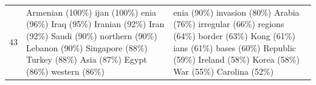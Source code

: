 \documentclass{article}
\begin{document}
\begin{table}[htbp]
\begin{tabular}{p{1.4cm} p{6cm} p{6cm}}
\midrule
43 & \colorbox{lightOlmoeLightBlue}{ Armenian} (100\%) \colorbox{lightOlmoeLightBlue}{ijan} (100\%) \colorbox{lightOlmoeLightBlue}{enia} (96\%) \colorbox{lightOlmoeLightBlue}{ Iraq} (95\%) \colorbox{lightOlmoeLightBlue}{ Iranian} (92\%) \colorbox{lightOlmoeLightBlue}{ Iran} (92\%) \colorbox{lightOlmoeLightBlue}{ Saudi} (90\%) \colorbox{lightOlmoeLightBlue}{ northern} (90\%) \colorbox{lightOlmoeLightBlue}{ Lebanon} (90\%) \colorbox{lightOlmoeLightBlue}{ Singapore} (88\%) \colorbox{lightOlmoeLightBlue}{ Turkey} (88\%) \colorbox{lightOlmoeLightBlue}{ Asia} (87\%) \colorbox{lightOlmoeLightBlue}{ Egypt} (86\%) \colorbox{lightOlmoeLightBlue}{ western} (86\%) &
\colorbox{lightOlmoeLightBlue}{enia} (90\%) \colorbox{lightOlmoeLightBlue}{ invasion} (80\%) \colorbox{lightOlmoeLightBlue}{ Arabia} (76\%) \colorbox{lightOlmoeLightBlue}{ irregular} (66\%) \colorbox{lightOlmoeLightBlue}{ regions} (64\%) \colorbox{lightOlmoeLightBlue}{ border} (63\%) \colorbox{lightOlmoeLightBlue}{ Kong} (61\%) \colorbox{lightOlmoeLightBlue}{ians} (61\%) \colorbox{lightOlmoeLightBlue}{ bases} (60\%) \colorbox{lightOlmoeLightBlue}{ Republic} (59\%) \colorbox{lightOlmoeLightBlue}{ Ireland} (58\%) \colorbox{lightOlmoeLightBlue}{ Korea} (58\%) \colorbox{lightOlmoeLightBlue}{ War} (55\%) \colorbox{lightOlmoeLightBlue}{ Carolina} (52\%) \\

\end{tabular}
\end{table}
\end{document}
